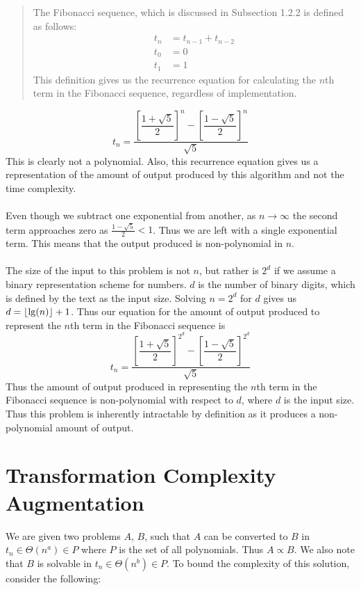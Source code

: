 \documentclass[aip, jmp, amsmath,amssymb, reprint]{revtex4-1}
\DeclarePairedDelimiter\floor{\lfloor}{\rfloor}
\theoremstyle{definition}
\begin{document}
\begin{quote}
The Fibonacci sequence, which is discussed in Subsection 1.2.2 is 
defined as follows: 
%
\begin{align*}
t_n &= t_{n-1} + t_{n-2} \\
t_0 &= 0 \\
t_1 &= 1
\end{align*}
This definition gives us the recurrence equation for calculating the $n$th 
term in the Fibonacci sequence, regardless of implementation.
\end{quote}
%
$$
t_n = 
    \dfrac{\left[\dfrac{1 + \sqrt{5}}{2}\right]^n - 
           \left[\dfrac{1 - \sqrt{5}}{2}\right]^n}{\sqrt{5}}
$$
This is clearly not a polynomial. Also, this recurrence equation gives us a 
representation of the amount of output produced by this algorithm and not the
time complexity. 
\\
\\
Even though we subtract one exponential from another, as $n \rightarrow \infty$
the second term approaches zero as $\frac{1 - \sqrt{5}}{2} < 1$. Thus we
are left with a single exponential term. This means that the output produced
is non-polynomial in $n$.
\\
\\
The size of the input to this problem is not $n$, but rather is $2^d$ if we 
assume a binary representation scheme for numbers. $d$ is the number of binary
digits, which is defined by the text as the input size. Solving $n = 2^d$ for 
$d$ gives us $d = \floor{\lg(n)} + 1$. Thus our equation for the amount of 
output produced to represent the $n$th term in the Fibonacci sequence is 
$$
t_n = 
    \dfrac{\left[\dfrac{1 + \sqrt{5}}{2}\right]^{2^d} - 
           \left[\dfrac{1 - \sqrt{5}}{2}\right]^{2^d}}{\sqrt{5}}
$$
Thus the amount of output produced in representing the $n$th term in the 
Fibonacci sequence is non-polynomial with respect to $d$, where $d$ is the input 
size. Thus this problem is inherently intractable by definition as it produces
a non-polynomial amount of output.

\section{Transformation Complexity Augmentation}

We are given two problems $A$, $B$, such that $A$ can be converted to $B$ in 
$t_n \in \Theta(n^a) \in P$ where $P$ is the set of all polynomials. Thus 
$A \propto B$. We also note that $B$ is solvable in $t_n \in \Theta(n^b) \in P$.
To bound the complexity of this solution, consider the following:
\end{document}

